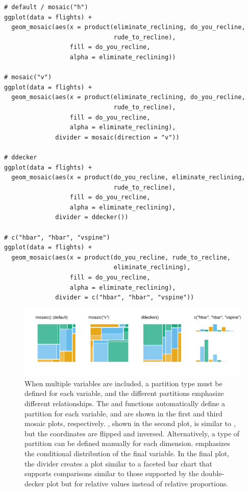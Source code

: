 \begin{verbatim}
# default / mosaic("h")
ggplot(data = flights) +
  geom_mosaic(aes(x = product(eliminate_reclining, do_you_recline,
                              rude_to_recline), 
                  fill = do_you_recline, 
                  alpha = eliminate_reclining))

# mosaic("v")
ggplot(data = flights) +
  geom_mosaic(aes(x = product(eliminate_reclining, do_you_recline,
                              rude_to_recline), 
                  fill = do_you_recline, 
                  alpha = eliminate_reclining),
              divider = mosaic(direction = "v"))

# ddecker
ggplot(data = flights) + 
  geom_mosaic(aes(x = product(do_you_recline, eliminate_reclining,
                              rude_to_recline), 
                  fill = do_you_recline, 
                  alpha = eliminate_reclining),
              divider = ddecker()) 

# c("hbar", "hbar", "vspine")
ggplot(data = flights) + 
  geom_mosaic(aes(x = product(do_you_recline, rude_to_recline,
                              eliminate_reclining), 
                  fill = do_you_recline, 
                  alpha = eliminate_reclining),
              divider = c("hbar", "hbar", "vspine"))
\end{verbatim}

\begin{figure}

{\centering \includegraphics[width=1\linewidth]{jeppson-hofmann_files/figure-latex/part3-1} 

}

\caption{When multiple variables are included, a partition type must be defined for each variable, and the different partitions emphasize different relationships. The  and  functions automatically define a partition for each variable, and are shown in the first and third mosaic plots, respectively. , shown in the second plot, is similar to , but the coordinates are flipped and inversed. Alternatively, a type of partition can be defined manually for each dimension.  emphasizes the conditional distribution of the final variable. In the final plot, the divider  creates a plot similar to a faceted bar chart that supports comparisons similar to those supported by the double-decker plot but for relative values instead of relative proportions.}\label{fig:part3}
\end{figure}

